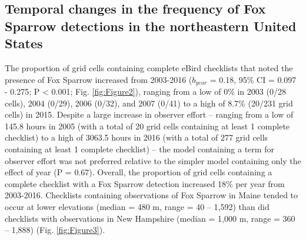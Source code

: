 \documentclass[fleqn,10pt,lineno]{wlpeerj} %
\begin{document}
\subsection*{Temporal changes in the frequency of Fox Sparrow detections in the northeastern United States}
The proportion of grid cells containing complete eBird checklists that noted the presence of Fox Sparrow increased from 2003-2016 ($b_{year}$ = 0.18, 95\% CI = 0.097 - 0.275; P < 0.001; Fig. \ref{fig:Figure2}), ranging from a low of 0\% in 2003 (0/28 cells), 2004 (0/29), 2006 (0/32), and 2007 (0/41) to a high of 8.7\% (20/231 grid cells) in 2015. Despite a large increase in observer effort – ranging from a low of 145.8 hours in 2005 (with a total of 20 grid cells containing at least 1 complete checklist) to a high of 3063.5 hours in 2016 (with a total of 277 grid cells containing at least 1 complete checklist) – the model containing a term for observer effort was not preferred relative to the simpler model containing only the effect of year (P = 0.67). Overall, the proportion of grid cells containing a complete checklist with a Fox Sparrow detection increased 18\% per year from 2003-2016. Checklists containing observations of Fox Sparrow in Maine tended to occur at lower elevations (median = 480 m, range = 40 – 1,592) than did checklists with observations in New Hampshire (median = 1,000 m, range = 360 – 1,888) (Fig. \ref{fig:Figure3}). 
\end{document}
